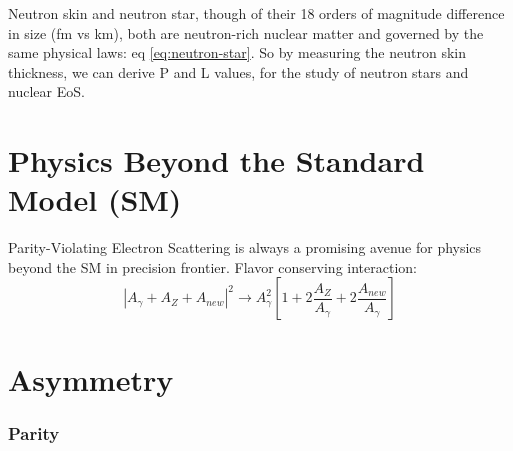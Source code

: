 Neutron skin and neutron star, though of their 18 orders of magnitude difference 
in size (fm vs km), both are neutron-rich nuclear matter and governed by the 
same physical laws: eq \eqref{eq:neutron-star}. So by measuring the neutron
skin thickness, we can derive P and L values, for the study of neutron stars
and nuclear EoS.

\section{Physics Beyond the Standard Model (SM)} 
Parity-Violating Electron Scattering is always a promising avenue for physics
beyond the SM in precision frontier.
Flavor conserving interaction:
$$ |A_\gamma + A_Z + A_{new}|^2 \rightarrow A^2_\gamma\left[ 1 + 2\frac{A_Z}{A_\gamma}
 + 2\frac{A_{new}}{A_\gamma} \right]$$

\section{Asymmetry}
\subsubsection{Parity}

